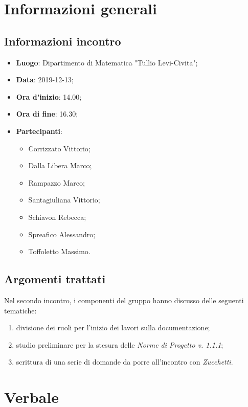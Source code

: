 \section{Informazioni generali}
    \subsection{Informazioni incontro}
        \begin{itemize}
            \item \textbf{Luogo}: Dipartimento di Matematica "Tullio Levi-Civita";
            \item \textbf{Data}: 2019-12-13;
            \item \textbf{Ora d'inizio}: 14.00;
            \item \textbf{Ora di fine}: 16.30;
            \item \textbf{Partecipanti}: \begin{itemize}
                \item Corrizzato Vittorio;
                \item Dalla Libera Marco;
                \item Rampazzo Marco;
                \item Santagiuliana Vittorio;
                \item Schiavon Rebecca;
                \item Spreafico Alessandro;
                \item Toffoletto Massimo.
            \end{itemize}
        \end{itemize}
    \subsection{Argomenti trattati}
        Nel secondo incontro, i componenti del gruppo hanno discusso delle seguenti tematiche:
        \begin{enumerate}
            \item divisione dei ruoli per l'inizio dei lavori sulla documentazione;
            \item studio preliminare per la stesura delle \textit{Norme di Progetto v. 1.1.1};
            \item scrittura di una serie di domande da porre all'incontro con \textit{Zucchetti}.
        \end{enumerate}
\section{Verbale}
